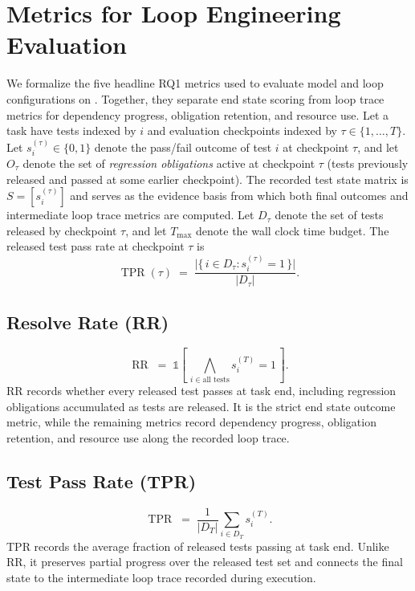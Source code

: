 \section{Metrics for Loop Engineering Evaluation}\label{app:metrics}

We formalize the five headline RQ1 metrics used to evaluate model and loop configurations on \lhb{}. Together, they separate end state scoring from loop trace metrics for dependency progress, obligation retention, and resource use. Let a task have tests indexed by $i$ and evaluation checkpoints indexed by $\tau \in \{1,\dots,T\}$. Let $s_i^{(\tau)} \in \{0,1\}$ denote the pass/fail outcome of test $i$ at checkpoint $\tau$, and let $O_\tau$ denote the set of \emph{regression obligations} active at checkpoint $\tau$ (tests previously released and passed at some earlier checkpoint).
The recorded test state matrix is $S = [s_i^{(\tau)}]$ and serves as the evidence basis from which both final outcomes and intermediate loop trace metrics are computed.
Let $D_\tau$ denote the set of tests released by checkpoint $\tau$, and let $T_{\max}$ denote the wall clock time budget. The released test pass rate at checkpoint $\tau$ is
\begin{equation}
\operatorname{TPR}(\tau) \;=\; \frac{\bigl|\{\, i \in D_\tau : s_i^{(\tau)} = 1 \,\}\bigr|}{|D_\tau|}.
\end{equation}

\subsection{Resolve Rate (RR)}\label{app:final-success}
\begin{equation}
\operatorname{RR} \;=\; \mathbb{1}\!\left[\,\bigwedge_{i \in \text{all tests}} s_i^{(T)} = 1\,\right].
\end{equation}
RR records whether every released test passes at task end, including regression obligations accumulated as tests are released. It is the strict end state outcome metric, while the remaining metrics record dependency progress, obligation retention, and resource use along the recorded loop trace.

\subsection{Test Pass Rate (TPR)}\label{app:pass-rate}
\begin{equation}
\operatorname{TPR} \;=\; \frac{1}{|D_T|}\sum_{i \in D_T} s_i^{(T)}.
\end{equation}
TPR records the average fraction of released tests passing at task end. Unlike RR, it preserves partial progress over the released test set and connects the final state to the intermediate loop trace recorded during execution.

